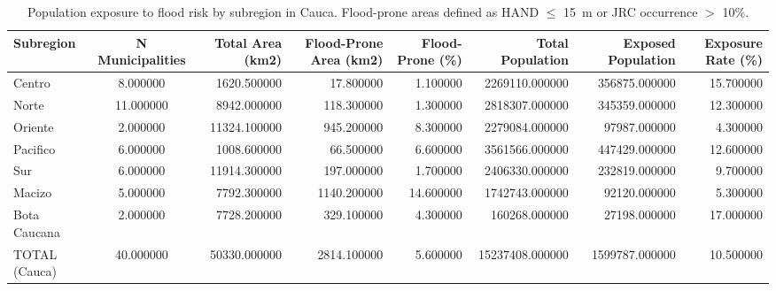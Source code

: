 \begin{table}[htbp]
\caption{Population exposure to flood risk by subregion in Cauca. Flood-prone areas defined as HAND $\leq$ 15~m or JRC occurrence $>$ 10\%.}
\label{tab:population_exposure}
\begin{tabular}{lcrrrrrr}
\toprule
Subregion & N Municipalities & Total Area (km2) & Flood-Prone Area (km2) & Flood-Prone (\%) & Total Population & Exposed Population & Exposure Rate (\%) \\
\midrule
Centro & 8.000000 & 1620.500000 & 17.800000 & 1.100000 & 2269110.000000 & 356875.000000 & 15.700000 \\
Norte & 11.000000 & 8942.000000 & 118.300000 & 1.300000 & 2818307.000000 & 345359.000000 & 12.300000 \\
Oriente & 2.000000 & 11324.100000 & 945.200000 & 8.300000 & 2279084.000000 & 97987.000000 & 4.300000 \\
Pacifico & 6.000000 & 1008.600000 & 66.500000 & 6.600000 & 3561566.000000 & 447429.000000 & 12.600000 \\
Sur & 6.000000 & 11914.300000 & 197.000000 & 1.700000 & 2406330.000000 & 232819.000000 & 9.700000 \\
Macizo & 5.000000 & 7792.300000 & 1140.200000 & 14.600000 & 1742743.000000 & 92120.000000 & 5.300000 \\
Bota Caucana & 2.000000 & 7728.200000 & 329.100000 & 4.300000 & 160268.000000 & 27198.000000 & 17.000000 \\
TOTAL (Cauca) & 40.000000 & 50330.000000 & 2814.100000 & 5.600000 & 15237408.000000 & 1599787.000000 & 10.500000 \\
\bottomrule
\end{tabular}
\end{table}
